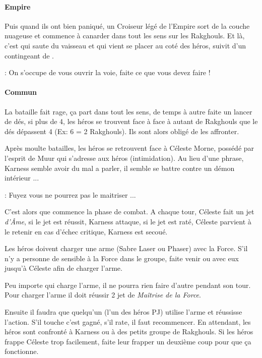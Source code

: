\paragraph{Empire}
Puis quand ils ont bien paniqué, un Croiseur légé de l’Empire sort de la couche nuageuse et commence à canarder dans tout les sens sur les Rakghouls. Et là, c’est  qui saute du vaisseau et qui vient se placer au coté des héros, suivit d’un contingeant de . 
\begin{quotebox}
    : On s’occupe de vous ouvrir la voie, faite ce que vous devez faire !
\end{quotebox}

\paragraph{Commun}
La bataille fait rage, ça part dans tout les sens, de temps à autre faite un lancer de dés, si plus de 4, les héros se trouvent face à face à autant de Rakghouls que le dés dépassent 4 (Ex: 6 = 2 Rakghouls). Ils sont alors obligé de les affronter. 

Après moulte batailles, les héros se retrouvent face à Céleste Morne, possédé par l’esprit de Muur qui s’adresse aux héros (intimidation). Au lieu d'une phrase, Karness semble avoir du mal a parler, il semble se battre contre un démon intérieur ... 
\begin{quotebox}
    : Fuyez vous ne pourrez pas le maitriser ... 
\end{quotebox}

C’est alors que commence la phase de combat. A chaque tour, Céleste fait un jet \textit{d’\^Ame}, si le jet est réussit, Karness attaque, si le jet est raté, Céleste parvient à le retenir en cas d’échec critique, Karness est secoué.

Les héros doivent charger une arme (Sabre Laser ou Phaser) avec la Force. S’il n’y a personne de sensible à la Force dans le groupe, faite venir  ou  avec eux jusqu’à Céleste afin de charger l’arme.

Peu importe qui charge l’arme, il ne pourra rien faire d’autre pendant son tour. Pour charger l’arme il doit réussir 2 jet de \textit{Maîtrise de la Force}.

Ensuite il faudra que quelqu’un (l’un des héros PJ) utilise l’arme et réussisse l’action. S’il touche c’est gagné, s’il rate, il faut recommencer. En attendant, les héros sont confronté à Karness ou à des petits groupe de Rakghouls. Si les héros frappe Céleste trop facilement, faite leur frapper un deuxième coup pour que ça fonctionne.

